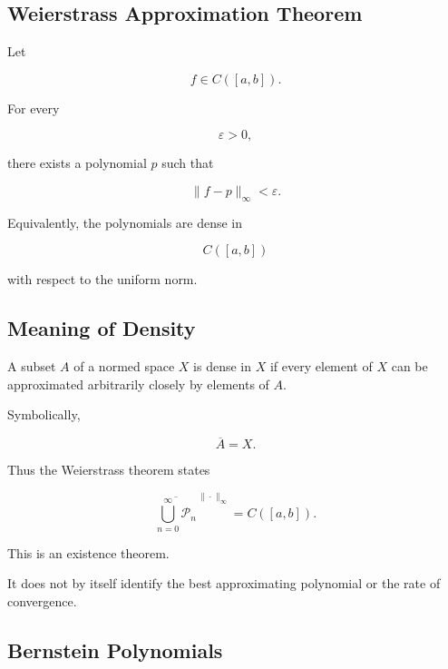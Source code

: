 \subsection{Weierstrass Approximation Theorem}
\label{subsec:weierstrass-approximation}

\begin{theorem}
Let

\[
f\in C([a,b]).
\]

For every

\[
\varepsilon>0,
\]

there exists a polynomial \(p\) such that

\[
\boxed{
\|f-p\|_\infty<\varepsilon.
}
\]
\end{theorem}

Equivalently, the polynomials are dense in

\[
\boxed{
C([a,b])
}
\]

with respect to the uniform norm.

\subsection{Meaning of Density}
\label{subsec:approximation-density}

A subset \(A\) of a normed space \(X\) is dense in \(X\) if every element
of \(X\) can be approximated arbitrarily closely by elements of \(A\).

Symbolically,

\[
\boxed{
\overline{A}=X.
}
\]

Thus the Weierstrass theorem states

\[
\boxed{
\overline{
\bigcup_{n=0}^{\infty}\mathcal{P}_n
}^{\,\|\cdot\|_\infty}
=
C([a,b]).
}
\]

This is an existence theorem.

It does not by itself identify the best approximating polynomial or the
rate of convergence.

\subsection{Bernstein Polynomials}
\label{subsec:bernstein-polynomials}

